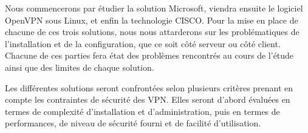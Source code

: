 Nous commencerons par étudier la solution Microsoft, viendra ensuite le logiciel OpenVPN sous Linux, et enfin la technologie CISCO. Pour la mise en place de chacune de ces trois solutions, nous nous attarderons sur les problématiques de l'installation et de la configuration, que ce soit côté serveur ou côté client. Chacune de ces parties fera état des problèmes rencontrés au cours de l'étude ainsi que des limites de chaque solution.

Les différentes solutions seront confrontées selon plusieurs critères prenant en compte les contraintes de sécurité des VPN. Elles seront d'abord évaluées en termes de complexité d'installation et d'administration, puis en termes de performances, de niveau de sécurité fourni et de facilité d'utilisation.

\pagebreak
